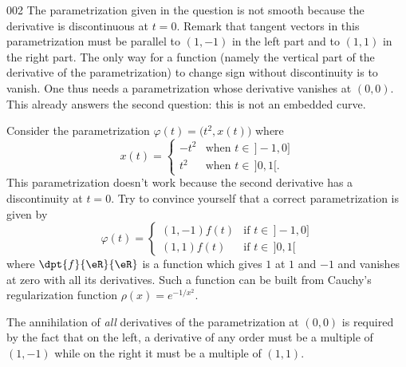 \begin{corrige}{002}
The parametrization given in the question is not smooth because the derivative is discontinuous at $t=0$. Remark that tangent vectors in this parametrization must be parallel to $(1,-1)$ in the left part and to $(1,1)$ in the right part. The only way for a function (namely the vertical part of the derivative of the parametrization) to change sign without discontinuity is to vanish. One thus needs a parametrization whose derivative vanishes at $(0,0)$. This already answers the second question: this is not an embedded curve.
 
Consider the parametrization $\varphi(t)=\big( t^2, x(t) \big)$ where
\[ 
  x(t)=
\begin{cases}
 -t^2& \text{when $t\in\,]-1,0]$}\\
t^2  & \text{when $t\in\,]0,1[$}.
\end{cases}
\]
This parametrization doesn't work because the second derivative has a discontinuity at $t=0$. Try to convince yourself that a correct parametrization is given by
\[ 
  \varphi(t)=
\begin{cases}
(1,-1)f(t)&\text{if $t\in\,]-1,0]$}\\
(1,1)f(t) &\text{if $t\in\,]0,1[$}
\end{cases}
\]
where $\dpt{ f }{ \eR }{ \eR }$ is a function which gives $1$ at $1$ and $-1$ and vanishes at zero with all its derivatives. Such a function can be built from Cauchy's regularization function $\rho(x)=e^{-1/x^2}$.

The annihilation of \emph{all} derivatives of the parametrization at $(0,0)$ is required by the fact that on the left, a derivative of any order must be a multiple of $(1,-1)$ while on the right it must be a multiple of $(1,1)$.


\end{corrige}
